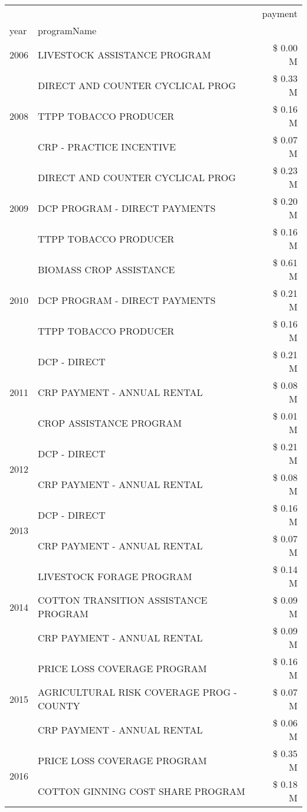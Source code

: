 \begin{tabular}{llr}
\toprule
 &  & payment \\
year & programName &  \\
\midrule
2006 & LIVESTOCK ASSISTANCE PROGRAM & \$ 0.00 M \\
\cline{1-3}
\multirow[t]{3}{*}{2008} & DIRECT AND COUNTER CYCLICAL PROG & \$ 0.33 M \\
 & TTPP TOBACCO PRODUCER & \$ 0.16 M \\
 & CRP - PRACTICE INCENTIVE & \$ 0.07 M \\
\cline{1-3}
\multirow[t]{3}{*}{2009} & DIRECT AND COUNTER CYCLICAL PROG & \$ 0.23 M \\
 & DCP PROGRAM - DIRECT PAYMENTS & \$ 0.20 M \\
 & TTPP TOBACCO PRODUCER & \$ 0.16 M \\
\cline{1-3}
\multirow[t]{3}{*}{2010} & BIOMASS CROP ASSISTANCE & \$ 0.61 M \\
 & DCP PROGRAM - DIRECT PAYMENTS & \$ 0.21 M \\
 & TTPP TOBACCO PRODUCER & \$ 0.16 M \\
\cline{1-3}
\multirow[t]{3}{*}{2011} & DCP - DIRECT & \$ 0.21 M \\
 & CRP PAYMENT - ANNUAL RENTAL & \$ 0.08 M \\
 & CROP ASSISTANCE PROGRAM & \$ 0.01 M \\
\cline{1-3}
\multirow[t]{2}{*}{2012} & DCP - DIRECT & \$ 0.21 M \\
 & CRP PAYMENT - ANNUAL RENTAL & \$ 0.08 M \\
\cline{1-3}
\multirow[t]{2}{*}{2013} & DCP - DIRECT & \$ 0.16 M \\
 & CRP PAYMENT - ANNUAL RENTAL & \$ 0.07 M \\
\cline{1-3}
\multirow[t]{3}{*}{2014} & LIVESTOCK FORAGE PROGRAM & \$ 0.14 M \\
 & COTTON TRANSITION ASSISTANCE PROGRAM & \$ 0.09 M \\
 & CRP PAYMENT - ANNUAL RENTAL & \$ 0.09 M \\
\cline{1-3}
\multirow[t]{3}{*}{2015} & PRICE LOSS COVERAGE PROGRAM & \$ 0.16 M \\
 & AGRICULTURAL RISK COVERAGE PROG - COUNTY & \$ 0.07 M \\
 & CRP PAYMENT - ANNUAL RENTAL & \$ 0.06 M \\
\cline{1-3}
\multirow[t]{3}{*}{2016} & PRICE LOSS COVERAGE PROGRAM                   & \$ 0.35 M \\
 & COTTON GINNING COST SHARE PROGRAM             & \$ 0.18 M \\

\end{tabular}
